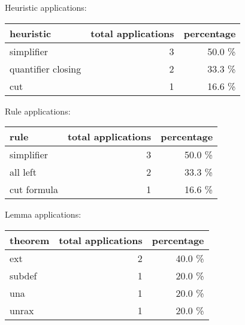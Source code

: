 \documentclass[a4paper]{article}
\begin{document}
\medskip


Heuristic applications:

\begin{supertabular}{l|r|r}
heuristic	& total applications & percentage \\ \hline
simplifier & 3 & 50.0 \% \\
quantifier closing & 2 & 33.3 \% \\
cut & 1 & 16.6 \% \\

\end{supertabular}

Rule applications:

\begin{supertabular}{l|r|r}
rule	        & total applications & percentage \\ \hline
simplifier & 3 & 50.0 \% \\
all left & 2 & 33.3 \% \\
cut formula & 1 & 16.6 \% \\

\end{supertabular}

Lemma applications:

\begin{supertabular}{l|r|r}
theorem	        & total applications & percentage \\ \hline
ext & 2 & 40.0 \% \\
subdef & 1 & 20.0 \% \\
una & 1 & 20.0 \% \\
unrax & 1 & 20.0 \% \\

\end{supertabular}
\end{document}
